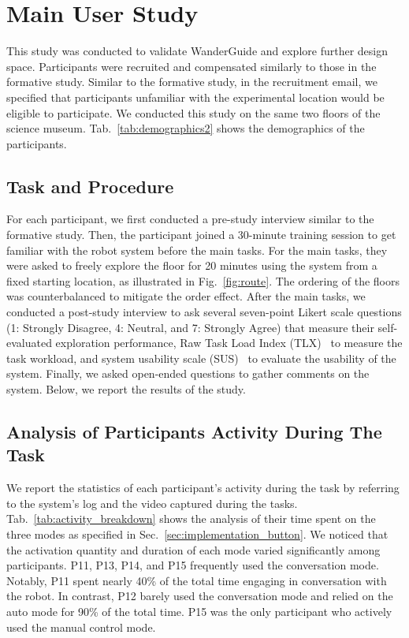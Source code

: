 \section{Main User Study}
\label{sec:study2}
This study was conducted to validate WanderGuide and explore further design space.
Participants were recruited and compensated similarly to those in the formative study.
Similar to the formative study, in the recruitment email, we specified that participants unfamiliar with the experimental location would be eligible to participate.
We conducted this study on the same two floors of the science museum. 
Tab.~\ref{tab:demographics2} shows the demographics of the participants.

\subsection{Task and Procedure}
For each participant, we first conducted a pre-study interview similar to the formative study.
Then, the participant joined a 30-minute training session to get familiar with the robot system before the main tasks.
For the main tasks, they were asked to freely explore the floor for 20 minutes using the system from a fixed starting location, as illustrated in Fig.~\ref{fig:route}.
The ordering of the floors was counterbalanced to mitigate the order effect.
After the main tasks, we conducted a post-study interview to ask several seven-point Likert scale questions (1: Strongly Disagree, 4: Neutral, and 7: Strongly Agree) that measure their self-evaluated exploration performance, Raw Task Load Index (TLX)~\cite{byers1989traditional} to measure the task workload, and system usability scale (SUS)~\cite{brooke1996sus} to evaluate the usability of the system.
Finally, we asked open-ended questions to gather comments on the system.
Below, we report the results of the study.




\subsection{Analysis of Participants Activity During The Task}
\label{sec:activity_breakdown}
We report the statistics of each participant's activity during the task by referring to the system's log and the video captured during the tasks. 
Tab.~\ref{tab:activity_breakdown} shows the analysis of their time spent on the three modes as specified in Sec.~\ref{sec:implementation_button}.
We noticed that the activation quantity and duration of each mode varied significantly among participants.
P11, P13, P14, and P15 frequently used the conversation mode.
Notably, P11 spent nearly 40\% of the total time engaging in conversation with the robot.
In contrast, P12 barely used the conversation mode and relied on the auto mode for 90\% of the total time.
P15 was the only participant who actively used the manual control mode.


